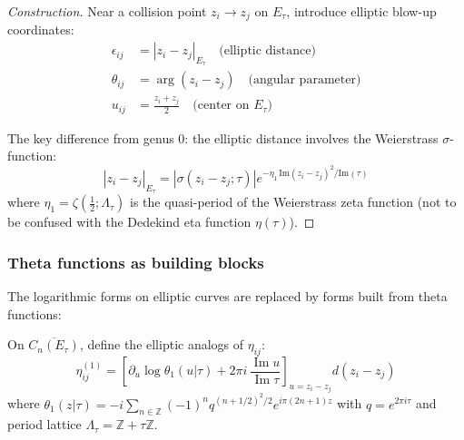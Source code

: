 \begin{proof}[Construction]
Near a collision point $z_i \to z_j$ on $E_\tau$, introduce elliptic blow-up coordinates:
\begin{align}
\epsilon_{ij} &= |z_i - z_j|_{E_\tau} \quad \text{(elliptic distance)} \\
\theta_{ij} &= \arg(z_i - z_j) \quad \text{(angular parameter)} \\
u_{ij} &= \frac{z_i + z_j}{2} \quad \text{(center on } E_\tau)
\end{align}

The key difference from genus 0: the elliptic distance involves the Weierstrass $\sigma$-function:
\[
|z_i - z_j|_{E_\tau} = |\sigma(z_i - z_j; \tau)|e^{-\eta_1\,\text{Im}(z_i - z_j)^2/\text{Im}(\tau)}
\]
where $\eta_1 = \zeta(\tfrac{1}{2}; \Lambda_\tau)$ is the quasi-period of the Weierstrass zeta function (not to be confused with the Dedekind eta function $\eta(\tau)$).
\end{proof}

\subsubsection{Theta functions as building blocks}

The logarithmic forms on elliptic curves are replaced by forms built from theta functions:

\begin{definition}
On $\overline{C_n(E_\tau)}$, define the elliptic analogs of $\eta_{ij}$:
\[
\eta_{ij}^{(1)}
=
\left[
\partial_u\log\theta_1(u|\tau)
+2\pi i\,\frac{\operatorname{Im}u}{\operatorname{Im}\tau}
\right]_{u=z_i-z_j}
d(z_i-z_j)
\]
where $\theta_1(z|\tau) = -i\sum_{n \in \mathbb{Z}}(-1)^n q^{(n+1/2)^2/2}e^{i\pi(2n+1)z}$ with $q = e^{2\pi i\tau}$ and period lattice $\Lambda_\tau=\mathbb Z+\tau\mathbb Z$.
\end{definition}

